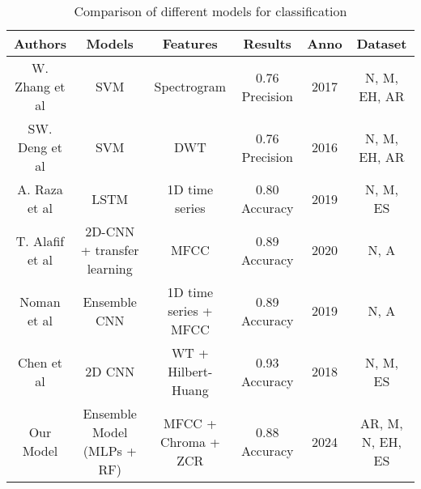 \begin{table*}[ht!]
    \small
    \centering
    \begin{tabular}{|c|c|c|c|c|c|}
    \hline
    \textbf{Authors} & \textbf{Models} & \textbf{Features} & \textbf{Results} & \textbf{Anno} & \textbf{Dataset} \\ \hline
    W. Zhang et al \cite{Zhang_Han_Deng_2017} & SVM & Spectrogram & 0.76 Precision & 2017 & N, M, EH, AR \\ \hline
    SW. Deng et al \cite{Deng_Han_2016} & SVM & DWT & 0.76 Precision & 2016 & N, M, EH, AR \\ \hline
    A. Raza et al \cite{Raza_Mehmood_Ullah_Ahmad_Choi_On_2019} & LSTM & 1D time series & 0.80 Accuracy & 2019 & N, M, ES \\ \hline
    T. Alafif et al \cite{Alafif_Boulares_Barnawi_Alafif_Althobaiti_Alferaidi_2020} & 2D-CNN + transfer learning & MFCC & 0.89 Accuracy & 2020 & N, A \\ \hline
    Noman et al \cite{Noman_Ting_Salleh_Ombao_2019} & Ensemble CNN & 1D time series + MFCC & 0.89 Accuracy & 2019 & N, A \\ \hline
    Chen et al \cite{Chen_Ren_Hao_Hu_2018} & 2D CNN & WT + Hilbert-Huang & 0.93 Accuracy & 2018 & N, M, ES \\ \hline
    Our Model & Ensemble Model (MLPs + RF) & MFCC + Chroma + ZCR & 0.88 Accuracy & 2024 & AR, M, N, EH, ES \\ \hline
    \end{tabular}
    \caption{Comparison of different models for classification}
\end{table*}